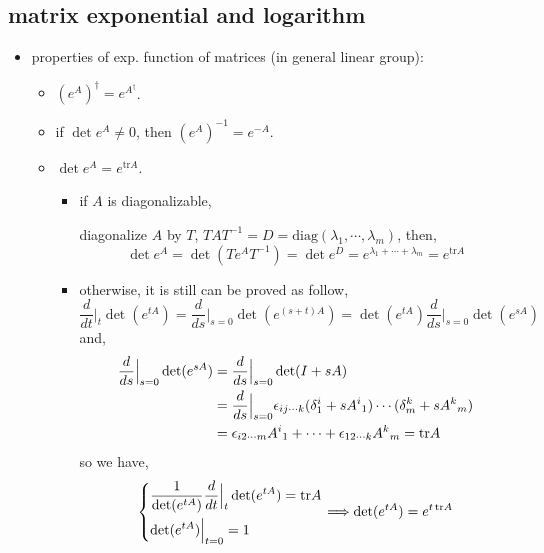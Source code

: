 \subsection{matrix exponential and logarithm}
\begin{itemize}
	\item properties of exp. function of matrices (in general linear group):
	\begin{itemize}
		
		\item $(e^A)^\dag = e^{A^\dag}$.
		
		\item if $\det e^A \neq 0$, then $(e^A)^{-1} = e^{- A}$.
		
		\item $\det e^A = e^{\mathrm{tr} A}$.
		
		\begin{tcolorbox}[title=proof:]
			\begin{itemize}
				\item if $A$ is diagonalizable,
				
				diagonalize $A$ by $T$, $T A T^{- 1} = D = \mathrm{diag}(\lambda_1, \cdots, \lambda_m)$, then,
				\begin{equation}
					\det e^A = \det(T e^A T^{- 1}) = \det e^D = e^{\lambda_1 + \cdots + \lambda_m} = e^{\mathrm{tr} A}
				\end{equation}
				
				\item otherwise, it is still can be proved as follow,
				\begin{equation}
					\frac{d}{dt} \Big|_t \det(e^{t A}) = \frac{d}{ds} \Big|_{s = 0} \det(e^{(s + t) A}) = \det(e^{t A}) \frac{d}{ds} \Big|_{s = 0} \det(e^{s A})
				\end{equation}
				and,
				\begin{align}
					\frac{d}{ds} \Big|_{s = 0} \det(e^{s A}) &= \frac{d}{ds} \Big|_{s = 0} \det(I + s A) \notag \\
					&= \frac{d}{ds} \Big|_{s = 0} \epsilon_{i j \cdots k} (\delta^i_1 + s {A^i}_1) \cdots (\delta^k_m + s {A^k}_m) \notag \\
					&= \epsilon_{i 2 \cdots m} {A^i}_1 + \cdots + \epsilon_{1 2 \cdots k} {A^k}_m = \mathrm{tr} A
				\end{align}
				so we have,
				\begin{equation}
					\begin{dcases}
						\frac{1}{\det(e^{t A})} \frac{d}{dt} \Big|_t \det(e^{t A}) = \mathrm{tr} A \\
						\det(e^{t A}) \Big|_{t = 0} = 1
					\end{dcases} \Longrightarrow \det(e^{t A}) = e^{t \, \mathrm{tr} A}
				\end{equation}
			\end{itemize}
		\end{tcolorbox}
		

\end{itemize}
\end{itemize}
